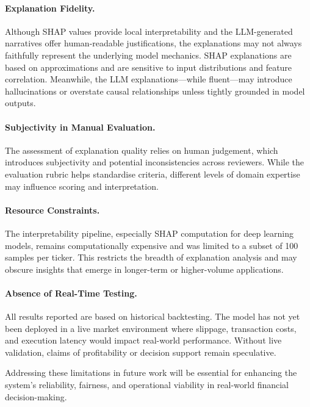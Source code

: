 \paragraph{Explanation Fidelity.}  
Although SHAP values provide local interpretability and the LLM-generated narratives offer human-readable justifications, the explanations may not always faithfully represent the underlying model mechanics. SHAP explanations are based on approximations and are sensitive to input distributions and feature correlation. Meanwhile, the LLM explanations—while fluent—may introduce hallucinations or overstate causal relationships unless tightly grounded in model outputs.

\paragraph{Subjectivity in Manual Evaluation.}  
The assessment of explanation quality relies on human judgement, which introduces subjectivity and potential inconsistencies across reviewers. While the evaluation rubric helps standardise criteria, different levels of domain expertise may influence scoring and interpretation.

\paragraph{Resource Constraints.}  
The interpretability pipeline, especially SHAP computation for deep learning models, remains computationally expensive and was limited to a subset of 100 samples per ticker. This restricts the breadth of explanation analysis and may obscure insights that emerge in longer-term or higher-volume applications.

\paragraph{Absence of Real-Time Testing.}  
All results reported are based on historical backtesting. The model has not yet been deployed in a live market environment where slippage, transaction costs, and execution latency would impact real-world performance. Without live validation, claims of profitability or decision support remain speculative.

\bigskip

Addressing these limitations in future work will be essential for enhancing the system’s reliability, fairness, and operational viability in real-world financial decision-making.

